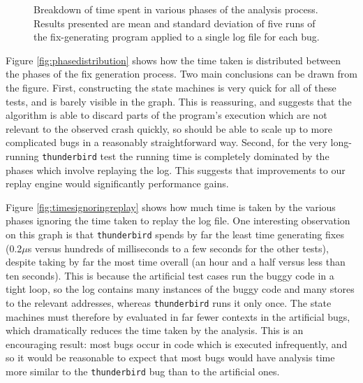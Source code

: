 \documentclass[10pt,twocolumn,preprint,natbib,authoryear]{sigplanconf}
\newcommand{\editorial}[1]{}
\begin{document}
\begin{figure*}
\hspace{10mm} 
\caption{Breakdown of time spent in various phases of the analysis
  process.  Results presented are mean and standard deviation of five
  runs of the fix-generating program applied to a single log file for
  each bug.}
\end{figure*}

Figure \ref{fig:phasedistribution} shows how the time taken is
distributed between the phases of the fix generation process.  Two
main conclusions can be drawn from the figure.  First, constructing
the state machines is very quick for all of these tests, and is barely
visible in the graph.  This is reassuring, and suggests that the
algorithm is able to discard parts of the program's execution which
are not relevant to the observed crash quickly, so should be able to
scale up to more complicated bugs in a reasonably straightforward
way\editorial{Not sure I believe that}.  Second, for the very
long-running \verb|thunderbird| test the running time is completely
dominated by the phases which involve replaying the log.  This
suggests that improvements to our replay engine would significantly
performance gains.

Figure \ref{fig:timesignoringreplay} shows how much time is taken by
the various phases ignoring the time taken to replay the log file.
One interesting observation on this graph is that \verb|thunderbird|
spends by far the least time generating fixes (0.2$\mu{}$s versus
hundreds of milliseconds to a few seconds for the other tests),
despite taking by far the most time overall (an hour and a half versus
less than ten seconds).  This is because the artificial test cases run
the buggy code in a tight loop, so the log contains many instances of
the buggy code and many stores to the relevant addresses, whereas
\verb|thunderbird| runs it only once.  The state machines must
therefore by evaluated in far fewer contexts in the artificial bugs,
which dramatically reduces the time taken by the analysis.  This is an
encouraging result: most bugs occur in code which is executed
infrequently, and so it would be reasonable to expect that most bugs
would have analysis time more similar to the \verb|thunderbird| bug
than to the artificial ones.
\end{document}
